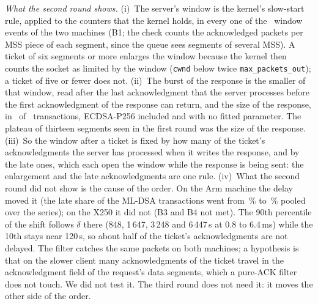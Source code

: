 \documentclass[9pt]{article}
\begin{document}
\emph{What the second round shows.} (i)~The server's window is the kernel's slow-start rule, applied to the counters that the kernel holds, in every one of the \RbEvN\ window events of the two machines (B1; the check counts the acknowledged packets per MSS piece of each segment, since the queue sees segments of several MSS). A ticket of six segments or more enlarges the window because the kernel then counts the socket as limited by the window (\texttt{cwnd} below twice \texttt{max\_packets\_out}); a ticket of five or fewer does not. (ii)~The burst of the response is the smaller of that window, read after the last acknowledgment that the server processes before the first acknowledgment of the response can return, and the size of the response, in \RbTxN\ of \RbTxN\ transactions, ECDSA-P256 included and with no fitted parameter. The plateau of thirteen segments seen in the first round was the size of the response. (iii)~So the window after a ticket is fixed by how many of the ticket's acknowledgments the server has processed when it writes the response, and by the late ones, which each open the window while the response is being sent: the enlargement and the late acknowledgments are one rule. (iv)~What the second round did not show is the cause of the order. On the Arm machine the delay moved it (the late share of the ML-DSA transactions went from \RbPilotLateZero\,\% to \RbPilotLateMax\,\% pooled over the series); on the X250 it did not (B3 and B4 not met). The 90th percentile of the shift follows $\delta$ there (848, 1\,647, 3\,248 and 6\,447\,\textmu s at 0.8 to 6.4\,ms) while the 10th stays near 120\,\textmu s, so about half of the ticket's acknowledgments are not delayed. The filter catches the same packets on both machines; a hypothesis is that on the slower client many acknowledgments of the ticket travel in the acknowledgment field of the request's data segments, which a pure-ACK filter does not touch. We did not test it. The third round does not need it: it moves the other side of the order.
\end{document}
